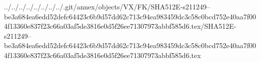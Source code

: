 ../../../../../../../../.git/annex/objects/VX/FK/SHA512E-s211249--be3a684ea6edd52defc64423c6b9d57dd62c713c94ea983459dc3c58c0bcd752e40aa7f004f13360e837f23c66a03af5de3816e0d5f26ee71307973abbf585d6.tex/SHA512E-s211249--be3a684ea6edd52defc64423c6b9d57dd62c713c94ea983459dc3c58c0bcd752e40aa7f004f13360e837f23c66a03af5de3816e0d5f26ee71307973abbf585d6.tex